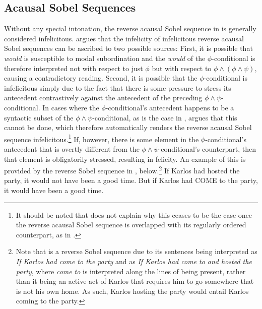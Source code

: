 \subsection{Acausal Sobel Sequences}
Without any special intonation, the reverse acausal Sobel sequence in  is generally considered infelicitous. \textcite[p. 151f]{Klecha2014} argues that the infelicity of infelicitous reverse acausal Sobel sequences can be ascribed to two possible sources: First, it is possible that \textit{would} is susceptible to modal subordination and the \textit{would} of the $\phi$-conditional is therefore interpreted not with respect to just $\phi$ but with respect to $\phi\land(\phi\land\psi)$, causing a contradictory reading. Second, it is possible that the $\phi$-conditional is infelicitous simply due to the fact that there is some pressure to stress its antecedent contrastively against the antecedent of the preceding $\phi\land\psi$-conditional. In cases where the $\phi$-conditional's antecedent happens to be a syntactic subset of the $\phi\land\psi$-conditional, as is the case in , \textcite{Klecha2014,Klecha2015} argues that this cannot be done, which therefore automatically renders the reverse acausal Sobel sequence infelicitous.\footnote{It should be noted that \parencite{Klecha2014,Klecha2015} does not explain why this ceases to be the case once the reverse acausal Sobel sequence is overlapped with its regularly ordered counterpart, as in .} If, however, there is some element in the $\phi$-conditional's antecedent that is overtly different from the $\phi\land\psi$-conditional's counterpart, then that element is obligatorily stressed, resulting in felicity. An example of this is provided by the reverse Sobel sequence in , below.\footnote{Note that  is a reverse Sobel sequence due to its sentences being interpreted as \textit{If Karlos had come to the party} and as \textit{If Karlos had come to and hosted the party}, where \textit{come to} is interpreted along the lines of being present, rather than it being an active act of Karlos that requires him to go somewhere that is not his own home. As such, Karlos hosting the party would entail Karlos coming to the party.}
\pex[nopreamble=true]\label{ex:contrast-host}%
\a{}If Karlos had hosted the party, it would not have been a good time.
\a{}But if Karlos had \MakeUppercase{come} to the party, it would have been a good time.\hfill\parencite[p.~151]{Klecha2014}
